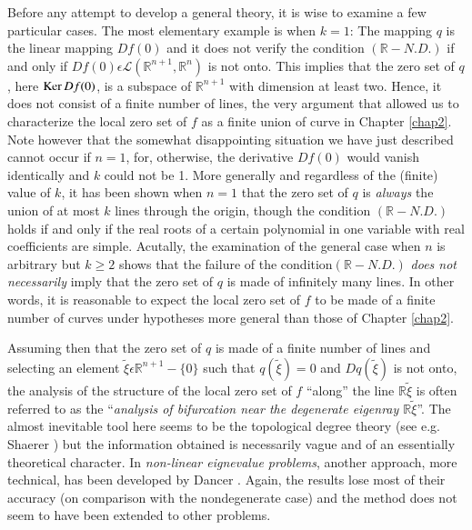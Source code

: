 Before any attempt to develop a general theory, it is wise to examine
a few particular cases. The most elementary example is when $k = 1$:
The mapping $q$ is the linear mapping $Df(0)$ and it does not verify the
condition $(\mathbb{R}-N.D.)$ if and only if $Df(0) \epsilon
\mathscr{L} (\mathbb{R}^{n+1}, \mathbb{R}^{n})$ is not onto. This
implies that the zero set of $q$, here $\operatorname{Ker} Df(0)$, is a subspace of
$\mathbb{R}^{n+1}$ with dimension at least two. Hence, it does not
consist of a finite number of lines, the very argument that allowed us
to characterize the local zero set of $f$ as a finite union of curve in
Chapter \ref{chap2}. Note however that the somewhat disappointing
situation we have just described cannot occur if $n = 1$, for,
otherwise, the derivative $Df(0)$ would vanish identically and $k$ could
not be 1. More generally and regardless of the (finite) value of $k$, it
has been shown when $n = 1$ that the zero set of $q$ is {\em always} the
union of at most $k$ lines through the origin, though the condition
$(\mathbb{R}-N.D.)$ holds if and only if the real roots of a certain
polynomial in one variable with real coefficients are
simple. Acutally, the examination of the general case when $n$ is
arbitrary but $k \geq 2$ shows that the failure of the
condition\pageoriginale $(\mathbb{R}-N.D.)$ {\em does not necessarily}
imply that the zero set of $q$ is made of infinitely many lines. In
other words, it is reasonable to expect the local zero set of $f$ to be
made of a finite number of curves under hypotheses more general than
those of Chapter \ref{chap2}.

Assuming then that the zero set of $q$ is made of a finite number of
lines and selecting an element $\widetilde{\xi} \epsilon
\mathbb{R}^{n+1} - \{0\}$ such that $q(\widetilde{\xi}) = 0$ and
$Dq(\widetilde{\xi})$ is not onto, the analysis of the structure of
the local zero set of $f$ ``along'' the line $\mathbb{R}
\widetilde{\xi}$ is often referred to as the ``{\em analysis of
  bifurcation near the degenerate eigenray $\mathbb{R}
  \widetilde{\xi}$}''. The almost inevitable tool here seems to be the
topological degree theory (see e.g. Shaerer \cite{39}) but the information obtained is necessarily vague and of an essentially theoretical character. In {\em non-linear eignevalue problems}, another approach,
more technical, has been developed by Dancer \cite{8}. Again, the results
lose most of their accuracy (on comparison with the nondegenerate
case) and the method does not seem to have been extended to other
problems.

